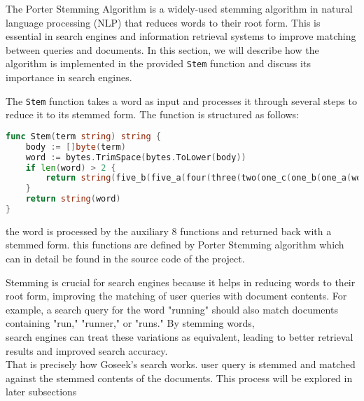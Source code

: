 The Porter Stemming Algorithm is a widely-used stemming algorithm in natural language processing (NLP) that reduces words to their root form. This is essential in search engines and information retrieval systems to improve matching between queries and documents. In this section, we will describe how the algorithm is implemented in the provided \texttt{Stem} function and discuss its importance in search engines.

The \texttt{Stem} function takes a word as input and processes it through several steps to reduce it to its stemmed form. The function is structured as follows:

\begin{lstlisting}[language=Go]
func Stem(term string) string {
    body := []byte(term)
    word := bytes.TrimSpace(bytes.ToLower(body))
    if len(word) > 2 {
        return string(five_b(five_a(four(three(two(one_c(one_b(one_a(word)))))))))
    }
    return string(word)
}
\end{lstlisting}
the word is processed by the auxiliary 8 functions and returned back with a stemmed form. this functions are defined by Porter Stemming algorithm which can in detail be found in the source code of the project.

Stemming is crucial for search engines because it helps in reducing words to their root form, improving the matching of user queries with document contents. For example, a search query for the word "running" should also match documents containing "run," "runner," or "runs." By stemming words, \\ 
search engines can treat these variations as equivalent, leading to better retrieval results and improved search accuracy. \\ 

That is precisely how Goseek's search works. user query is stemmed and matched against the stemmed contents of the documents. This process will be explored in later subsections

